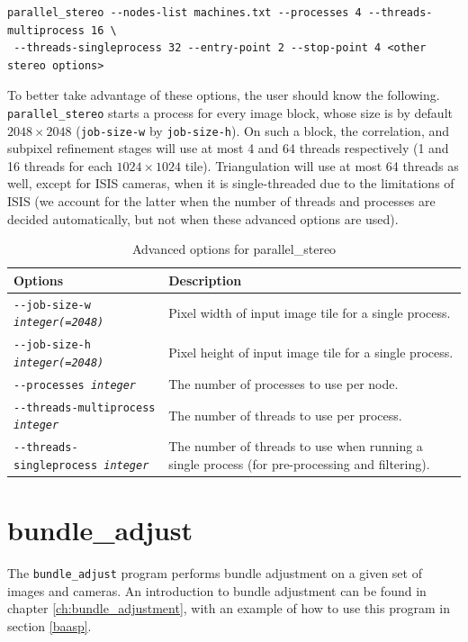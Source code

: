 \begin{verbatim}
parallel_stereo --nodes-list machines.txt --processes 4 --threads-multiprocess 16 \
 --threads-singleprocess 32 --entry-point 2 --stop-point 4 <other stereo options>
\end{verbatim}

To better take advantage of these options, the user should know the following.
\texttt{parallel\_stereo} starts a process for every image block, whose
size is by default $2048 \times 2048$ (\texttt{job-size-w} by
\texttt{job-size-h}). On such a block, the correlation, and subpixel
refinement stages will use at most 4 and 64 threads respectively (1 and
16 threads for each $1024 \times 1024$ tile). Triangulation will use at
most 64 threads as well, except for ISIS cameras, when it is
single-threaded due to the limitations of ISIS (we account for the
latter when the number of threads and processes are decided
automatically, but not when these advanced options are used).

\begin{longtable}{|l|p{7.5cm}|}
\caption{Advanced options for parallel\_stereo}
\label{tbl:advancedparallelstereo}
\endfirsthead
\endhead
\endfoot
\endlastfoot
\hline
Options & Description \\ \hline \hline
\texttt{-\/-job-size-w \textit{integer(=2048)}} & Pixel width of input
image tile for a single process. \\ \hline
\texttt{-\/-job-size-h \textit{integer(=2048)}} & Pixel height of input
image tile for a single process. \\ \hline
\texttt{-\/-processes \textit{integer}} & The number of processes to use per node. \\ \hline
\texttt{-\/-threads-multiprocess \textit{integer}} & The number of threads to use per process.\\ \hline
\texttt{-\/-threads-singleprocess \textit{integer}} & The number of threads to use when running a single process (for pre-processing and filtering).\\ \hline
\end{longtable}

\newpage
\section{bundle\_adjust}
\label{bundleadjust}

The \texttt{bundle\_adjust} program performs bundle adjustment on a
given set of images and cameras. An introduction to bundle adjustment
can be found in chapter \ref{ch:bundle_adjustment}, with an example of
how to use this program in section \ref{baasp}.


